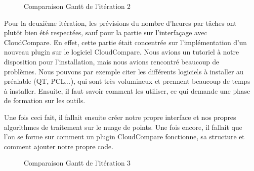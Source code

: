 \documentclass[12pt,titlepage,french]{article}
\begin{document}
\begin{figure}[!hbtp]
    \caption{\label{} Comparaison Gantt de l'itération 2}
\end{figure}

Pour la deuxième itération, les prévisions du nombre d'heures par tâches ont plutôt bien été respectées, sauf pour la partie sur l'interfaçage avec CloudCompare. En effet, cette partie était concentrée sur l'implémentation d'un nouveau plugin sur le logiciel CloudCompare. Nous avions un tutoriel à notre disposition pour l'installation, mais nous avions rencontré beaucoup de problèmes. Nous pouvons par exemple citer les différents logiciels à installer au préalable (QT, PCL...), qui sont très volumineux et prennent beaucoup de temps à installer. Ensuite, il faut savoir comment les utiliser, ce qui demande une phase de formation sur les outils. \newline

Une fois ceci fait, il fallait ensuite créer notre propre interface et nos propres algorithmes de traitement sur le nuage de points. Une fois encore, il fallait que l'on se forme sur comment un plugin CloudCompare fonctionne, sa structure et comment ajouter notre propre code.

\begin{figure}[!hbtp]
    \caption{\label{} Comparaison Gantt de l'itération 3}
\end{figure}
\end{document}
